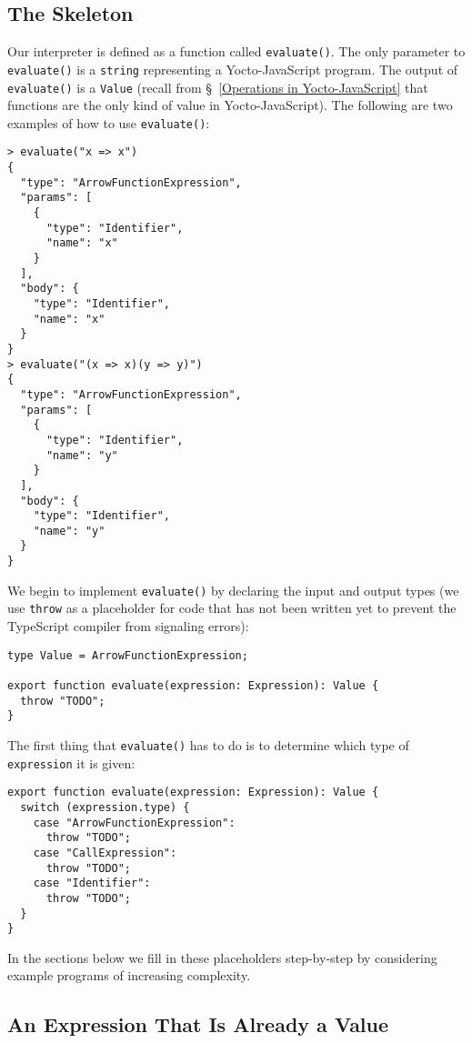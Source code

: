 \documentclass[12pt, oneside]{book}
\begin{document}
\subsection{The Skeleton}

Our interpreter is defined as a function called \texttt{evaluate()}. The only parameter to \texttt{evaluate()} is a \texttt{string} representing a Yocto-JavaScript program. The output of \texttt{evaluate()} is a \texttt{Value} (recall from §~\ref{Operations in Yocto-JavaScript} that functions are the only kind of value in Yocto-JavaScript). The following are two examples of how to use \texttt{evaluate()}:

\begin{verbatim}
> evaluate("x => x")
{
  "type": "ArrowFunctionExpression",
  "params": [
    {
      "type": "Identifier",
      "name": "x"
    }
  ],
  "body": {
    "type": "Identifier",
    "name": "x"
  }
}
> evaluate("(x => x)(y => y)")
{
  "type": "ArrowFunctionExpression",
  "params": [
    {
      "type": "Identifier",
      "name": "y"
    }
  ],
  "body": {
    "type": "Identifier",
    "name": "y"
  }
}
\end{verbatim}

We begin to implement \texttt{evaluate()} by declaring the input and output types (we use \texttt{throw} as a placeholder for code that has not been written yet to prevent the TypeScript compiler from signaling errors):

\begin{verbatim}
type Value = ArrowFunctionExpression;

export function evaluate(expression: Expression): Value {
  throw "TODO";
}
\end{verbatim}

The first thing that \texttt{evaluate()} has to do is to determine which type of \texttt{expression} it is given:

\begin{verbatim}
export function evaluate(expression: Expression): Value {
  switch (expression.type) {
    case "ArrowFunctionExpression":
      throw "TODO";
    case "CallExpression":
      throw "TODO";
    case "Identifier":
      throw "TODO";
  }
}
\end{verbatim}

In the sections below we fill in these placeholders step-by-step by considering example programs of increasing complexity.

\subsection{An Expression That Is Already a Value}
\end{document}

